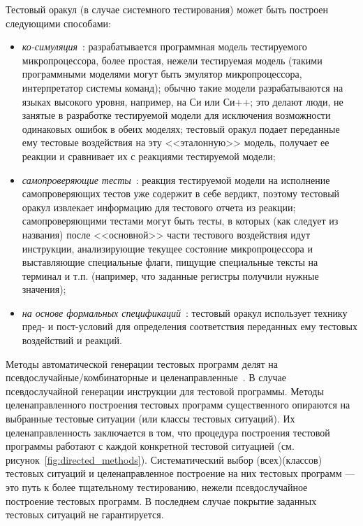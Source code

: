 Тестовый оракул (в случае системного тестирования) может быть построен следующими способами:
\begin{itemize}
  \item \emph{ко-симуляция}~\cite{HoPhD}: разрабатывается программная модель тестируемого микропроцессора, более простая, нежели тестируемая модель (такими программными моделями могут быть эмулятор микропроцессора, интерпретатор системы команд); обычно такие модели разрабатываются на языках высокого уровня, например, на Си или Си++; это делают люди, не занятые в разработке тестируемой модели для исключения возможности одинаковых ошибок в обеих моделях; тестовый оракул подает переданные ему тестовые воздействия на эту <<эталонную>> модель, получает ее реакции и сравнивает их с реакциями тестируемой модели;

  \item \emph{самопроверяющие тесты}~\cite{HoPhD}: реакция тестируемой модели на исполнение самопроверяющих тестов уже содержит в себе вердикт, поэтому тестовый оракул извлекает информацию для тестового отчета из реакции; самопроверяющими тестами могут быть тесты, в которых (как следует из названия) после <<основной>> части тестового воздействия идут инструкции, анализирующие текущее состояние микропроцессора и выставляющие специальные флаги, пищущие специальные тексты на терминал и т.п. (например, что заданные регистры получили нужные значения);

  \item \emph{на основе формальных спецификаций}~\cite{KamkinThesis}: тестовый оракул использует технику пред- и пост-условий для определения соответствия переданных ему тестовых воздействий и реакций.
\end{itemize}

Методы автоматической генерации тестовых программ делят на псевдослучайные/комбинаторные и целенаправленные~\cite{HoPhD}. В случае псевдослучайной генерации инструкции для тестовой программы. Методы целенаправленного построения тестовых программ существенного опираются на выбранные тестовые ситуации (или классы тестовых ситуаций). Их целенаправленность заключается в том, что процедура построения тестовой программы работают с каждой конкретной тестовой ситуацией (см. рисунок~\ref{fig:directed_methods}). Систематический выбор (всех)(классов) тестовых ситуаций и целенаправленное построение на них тестовых программ --- это путь к более тщательному тестированию, нежели псевдослучайное построение тестовых программ. В последнем случае покрытие заданных тестовых ситуаций не гарантируется.

